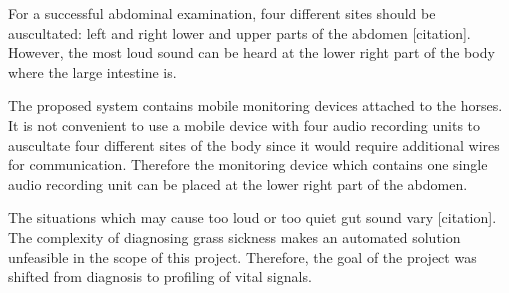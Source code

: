 For a successful abdominal examination, four different sites should be auscultated: left and right lower and upper parts of the abdomen [citation]. However, the most loud sound can be heard at the lower right part of the body where the large intestine is. 

The proposed system contains mobile monitoring devices attached to the horses. It is not convenient to use a mobile device with four audio recording units to auscultate four different sites of the body since it would require additional wires for communication. Therefore the monitoring device which contains one single audio recording unit can be placed at the lower right part of the abdomen.

The situations which may cause too loud or too quiet gut sound vary [citation]. The complexity of diagnosing grass sickness makes an automated solution unfeasible in the scope of this project. Therefore, the goal of the project was shifted from diagnosis to profiling of vital signals.   
